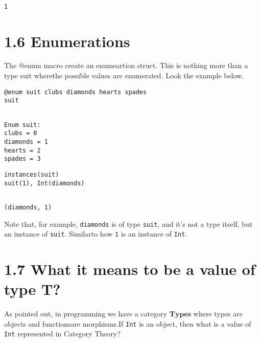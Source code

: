 \begingroup

\fontsize{10pt}{12pt}\selectfont

\begin{verbatim}

1
\end{verbatim}

\endgroup

\section{1.6 Enumerations}


The @enum macro create an enumeartion struct. This is nothing more than a type suit wherethe possible values are enumerated. Look the example below.
\bigskip
\begin{lstlisting}[language=JuliaLocal, style=julia, texcl=true]
@enum suit clubs diamonds hearts spades
suit
\end{lstlisting}

\begingroup

\fontsize{10pt}{12pt}\selectfont

\begin{verbatim}

Enum suit:
clubs = 0
diamonds = 1
hearts = 2
spades = 3
\end{verbatim}

\endgroup

\bigskip
\begin{lstlisting}[language=JuliaLocal, style=julia, texcl=true]
instances(suit)
suit(1), Int(diamonds)
\end{lstlisting}

\begingroup

\fontsize{10pt}{12pt}\selectfont

\begin{verbatim}

(diamonds, 1)
\end{verbatim}

\endgroup
Note that, for example, \lstinline[style=julia]{diamonds} is of type \lstinline[style=julia]{suit}, and it's not a type itself, but an instance of \lstinline[style=julia]{suit}. Similarto how  \lstinline[style=julia]{1} is an instance of \lstinline[style=julia]{Int}.
\section{1.7 What it means to be a value of type T?}


As pointed out, in programming we have a category $\textbf{Types}$ where types are objects and functionsare morphisms.If \lstinline[style=julia]{Int} is an object, then what is a value of \lstinline[style=julia]{Int} represented in Category Theory?

